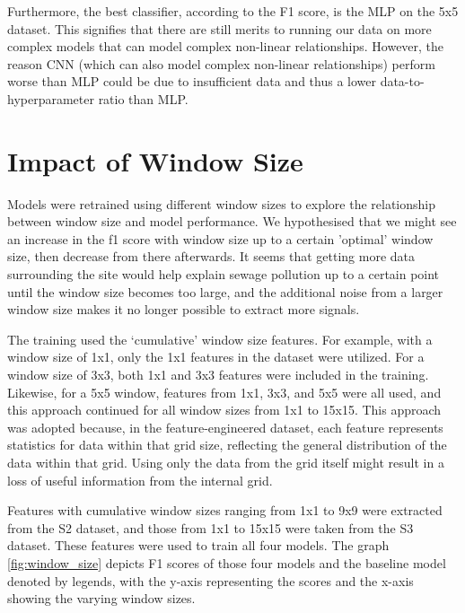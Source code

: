 \documentclass[a4paper,11pt]{report}
\begin{document}
Furthermore, the best classifier, according to the F1 score, is the MLP on the 5x5 dataset. This signifies that there are still merits to running our data on more complex models that can model complex non-linear relationships. However, the reason CNN (which can also model complex non-linear relationships) perform worse than MLP could be due to insufficient data and thus a lower data-to-hyperparameter ratio than MLP. 

\section{Impact of Window Size}
\label{sec:Impact of Window Size}

Models were retrained using different window sizes to explore the relationship between window size and model performance. We hypothesised that we might see an increase in the f1 score with window size up to a certain 'optimal' window size, then decrease from there afterwards. It seems that getting more data surrounding the site would help explain sewage pollution up to a certain point until the window size becomes too large, and the additional noise from a larger window size makes it no longer possible to extract more signals. 

The training used the ‘cumulative’ window size features. For example, with a window size of 1x1, only the 1x1 features in the dataset were utilized. For a window size of 3x3, both 1x1 and 3x3 features were included in the training. Likewise, for a 5x5 window, features from 1x1, 3x3, and 5x5 were all used, and this approach continued for all window sizes from 1x1 to 15x15. This approach was adopted because, in the feature-engineered dataset, each feature represents statistics for data within that grid size, reflecting the general distribution of the data within that grid. Using only the data from the grid itself might result in a loss of useful information from the internal grid.

Features with cumulative window sizes ranging from 1x1 to 9x9 were extracted from the S2 dataset, and those from 1x1 to 15x15 were taken from the S3 dataset. These features were used to train all four models. The graph \ref{fig:window_size} depicts F1 scores of those four models and the baseline model denoted by legends, with the y-axis representing the scores and the x-axis showing the varying window sizes.
\end{document}
